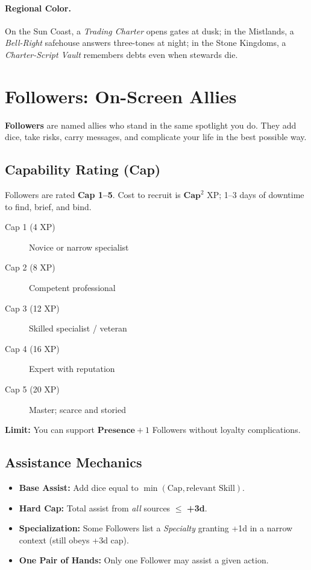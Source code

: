 \begin{multicols}{2}
\paragraph{Regional Color.}
On the Sun Coast, a \emph{Trading Charter} opens gates at dusk; in the Mistlands, a \emph{Bell-Right} safehouse answers three-tones at night; in the Stone Kingdoms, a \emph{Charter-Script Vault} remembers debts even when stewards die.

\section{Followers: On-Screen Allies}

\textbf{Followers} are named allies who stand in the same spotlight you do. They add dice, take risks, carry messages, and complicate your life in the best possible way.

\subsection*{Capability Rating (Cap)}
Followers are rated \textbf{Cap 1–5}. Cost to recruit is \(\textbf{Cap}^2\) XP; 1–3 days of downtime to find, brief, and bind.
\begin{description}
  \item[Cap 1 (4 XP)] Novice or narrow specialist
  \item[Cap 2 (8 XP)] Competent professional
  \item[Cap 3 (12 XP)] Skilled specialist / veteran
  \item[Cap 4 (16 XP)] Expert with reputation
  \item[Cap 5 (20 XP)] Master; scarce and storied
\end{description}
\textbf{Limit:} You can support \(\textbf{Presence} + 1\) Followers without loyalty complications. 

\subsection*{Assistance Mechanics}
\begin{itemize}
  \item \textbf{Base Assist:} Add dice equal to \(\min(\text{Cap}, \text{relevant Skill})\).
  \item \textbf{Hard Cap:} Total assist from \emph{all} sources \(\leq\) \textbf{+3d}. 
  \item \textbf{Specialization:} Some Followers list a \emph{Specialty} granting +1d in a narrow context (still obeys +3d cap).
  \item \textbf{One Pair of Hands:} Only one Follower may assist a given action.
\end{itemize}


\end{multicols}

